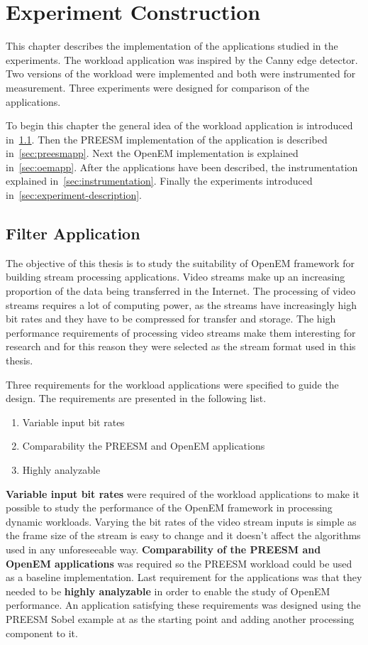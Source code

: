 \chapter{Experiment Construction}
\label{chapter:construction}
This chapter describes the implementation of the applications studied in the experiments. The workload application was inspired by the Canny edge detector. Two versions of the workload were implemented and both were instrumented for measurement. Three experiments were designed for comparison of the applications.

To begin this chapter the general idea of the workload application is introduced in~\ref{sec:filterapp}. Then the PREESM implementation of the application is described in~\ref{sec:preesmapp}. Next the OpenEM implementation is explained in~\ref{sec:oemapp}. After the applications have been described, the instrumentation explained in~\ref{sec:instrumentation}. Finally the experiments introduced in~\ref{sec:experiment-description}.

\section{Filter Application}
\label{sec:filterapp}
The objective of this thesis is to study the suitability of OpenEM framework for building stream processing applications. Video streams make up an increasing proportion of the data being transferred in the Internet. The processing of video streams requires a lot of computing power, as the streams have increasingly high bit rates and they have to be compressed for transfer and storage. The high performance requirements of processing video streams make them interesting for research and for this reason they were selected as the stream format used in this thesis.

Three requirements for the workload applications were specified to guide the design. The requirements are presented in the following list.

\begin{enumerate}
    \item{Variable input bit rates}
    \item{Comparability the PREESM and OpenEM applications}
    \item{Highly analyzable}
\end{enumerate}

\textbf{Variable input bit rates} were required of the workload applications to make it possible to study the performance of the OpenEM framework in processing dynamic workloads. Varying the bit rates of the video stream inputs is simple as the frame size of the stream is easy to change and it doesn't affect the algorithms used in any unforeseeable way. \textbf{Comparability of the PREESM and OpenEM applications} was required so the PREESM workload could be used as a baseline implementation. Last requirement for the applications was that they needed to be \textbf{highly analyzable} in order to enable the study of OpenEM performance. An application satisfying these requirements was designed using the PREESM Sobel example at \cite{preesmtut} as the starting point and adding another processing component to it.

